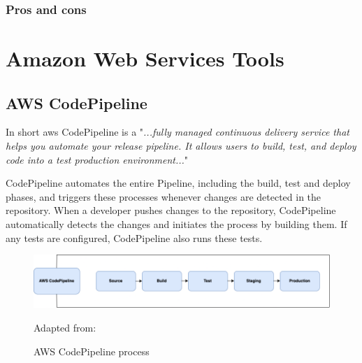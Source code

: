 \subsubsection{Pros and cons}


\section{Amazon Web Services Tools}

\subsection{AWS CodePipeline}
In short \acrshort{aws} CodePipeline is a "\textit{...fully managed continuous delivery service that helps you automate your release pipeline. It allows users to build, test, and deploy code into a test production environment...}"
\cite{AWSCodePipeline}

CodePipeline automates the entire \gls{Pipeline}, including the build, test and deploy phases, and triggers these processes whenever changes are detected in the repository. When a developer pushes changes to the repository, CodePipeline automatically detects the changes and initiates the process by building them. If any tests are configured, CodePipeline also runs these tests.\cite{AWSCodePipeline1}
\begin{figure}[H]
    \centering
    \includegraphics[scale=0.4]{Images/CodePipeline.png}
    \caption{AWS CodePipeline process}Adapted from: \cite{AWSCodePipeline2}
    \label{fig:AWS CodePipeline Process}
\end{figure}

